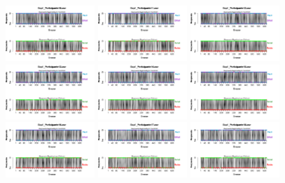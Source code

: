 \documentclass[a4paper ]{article}
\begin{document}
\begin{figure}[th]
\includegraphics[width=0.3\textwidth]{Figures/BiasResp_Exp1_P10} \includegraphics[width=0.3\textwidth]{Figures/BiasResp_Exp1_P11} \includegraphics[width=0.3\textwidth]{Figures/BiasResp_Exp1_P12}
\includegraphics[width=0.3\textwidth]{Figures/BiasResp_Exp1_P13} \includegraphics[width=0.3\textwidth]{Figures/BiasResp_Exp1_P14} \includegraphics[width=0.3\textwidth]{Figures/BiasResp_Exp1_P15}
\includegraphics[width=0.3\textwidth]{Figures/BiasResp_Exp1_P16} \includegraphics[width=0.3\textwidth]{Figures/BiasResp_Exp1_P17} \includegraphics[width=0.3\textwidth]{Figures/BiasResp_Exp1_P18}

\end{figure}
\end{document}
